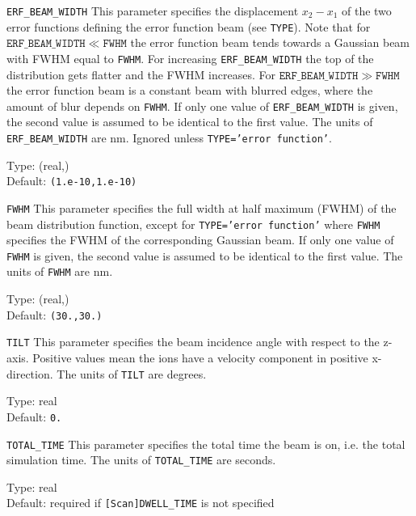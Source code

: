 \begin{keydescription}{\texttt{ERF\_BEAM\_WIDTH}}
This parameter specifies the displacement $x_2-x_1$ of the two error functions
defining the error function beam (see \texttt{TYPE}). Note that for
$\mathtt{ERF\_BEAM\_WIDTH} \ll \mathtt{FWHM}$ the error function beam tends
towards a Gaussian beam with FWHM equal to \texttt{FWHM}. For increasing
\texttt{ERF\_BEAM\_WIDTH} the top of the distribution gets flatter and the
FWHM increases. For $\mathtt{ERF\_BEAM\_WIDTH} \gg \mathtt{FWHM}$ the error
function beam is a constant beam with blurred edges, where the amount of blur
depends on \texttt{FWHM}. If only one value of \texttt{ERF\_BEAM\_WIDTH} is
given, the second value is assumed to be identical to the first value. The units
of \texttt{ERF\_BEAM\_WIDTH} are nm. Ignored unless \texttt{TYPE='error function'}.
\begin{keytab}
   Type:    \> (real,) \\
   Default: \> \texttt{(1.e-10,1.e-10)} 
\end{keytab}
\end{keydescription}

\begin{keydescription}{\texttt{FWHM}}
This parameter specifies the full width at half maximum (FWHM) of the beam
distribution function, except for \texttt{TYPE='error function'} where
\texttt{FWHM} specifies the FWHM of the corresponding Gaussian beam. If only one
value of \texttt{FWHM} is given, the second value is assumed to be identical to
the first value. The units of \texttt{FWHM} are nm.
\begin{keytab}
   Type:    \> (real,) \\
   Default: \> \texttt{(30.,30.)} 
\end{keytab}
\end{keydescription}

\begin{keydescription}{\texttt{TILT}}
This parameter specifies the beam incidence angle with respect to the z-axis.
Positive values mean the ions have a velocity component in positive x-direction.
The units of \texttt{TILT} are degrees.
\begin{keytab}
   Type:    \> real \\
   Default: \> \texttt{0.}
\end{keytab}
\end{keydescription}

\begin{keydescription}{\texttt{TOTAL\_TIME}}
This parameter specifies the total time the beam is on, i.e. the total
simulation time. The units of \texttt{TOTAL\_TIME} are seconds.  
\begin{keytab}
   Type:    \> real \\
   Default: \> required if \texttt{[Scan]DWELL\_TIME} is not specified 
\end{keytab}
\end{keydescription}

